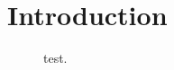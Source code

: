 \chapter{Introduction}



\begin{figure}[H]
\centering

\caption{test.}
\label{fig:test}
\end{figure}